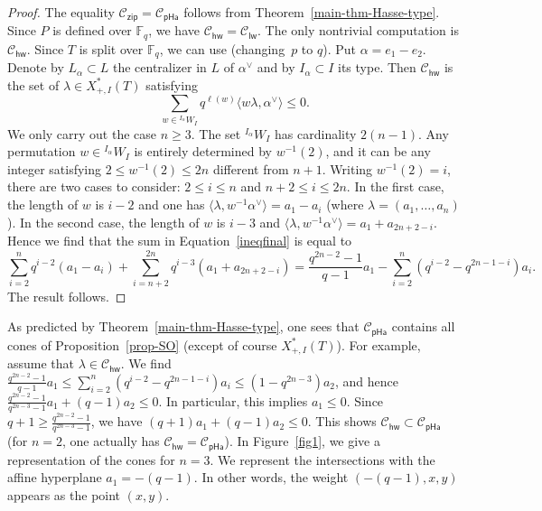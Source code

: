 \documentclass[11pt]{amsart}
\numberwithin{equation}{section}
\theoremstyle{definition}
\theoremstyle{remark}
\newcommand{\pha}{\mathsf{pHa}}
\newcommand{\zipsf}{\mathsf{zip}}
\newcommand{\lwsf}{\mathsf{lw}}
\newcommand{\hwsf}{\mathsf{hw}}
\newcommand{\Ccal}{{\mathcal C}}
\newcommand{\FF}{\mathbb{F}}
\begin{document}
\begin{proof}
The equality $\Ccal_{\zipsf} = \Ccal_{\pha}$ follows from Theorem~\ref{main-thm-Hasse-type}. Since $P$ is defined over $\FF_q$, we have $\Ccal_{\hwsf}=\Ccal_{\lwsf}$. The only nontrivial computation is $\Ccal_{\hwsf}$. Since $T$ is split over $\FF_q$, we can use \cite[Section~3.6]{Koskivirta-automforms-GZip} (changing~$p$ to $q$). Put $\alpha=e_1-e_2$. Denote by $L_\alpha \subset L$ the centralizer in $L$ of $\alpha^\vee$ and by $I_\alpha\subset I$ its type. Then $\Ccal_{\hwsf}$ is the set of $\lambda\in X_{+,I}^*(T)$ satisfying
\begin{equation}\label{ineqfinal}
\sum_{w\in {}^{I_\alpha} W_{I}} q^{\ell(w)}  \langle w \lambda, \alpha^\vee \rangle\leq 0.
\end{equation}
We only carry out the case $n\geq 3$. The set ${}^{I_{\alpha}}W_I$ has cardinality $2(n-1)$. Any permutation $w\in {}^{I_{\alpha}}W_I$ is entirely determined by $w^{-1}(2)$, and it can be any integer satisfying $2\leq w^{-1}(2)\leq 2n$ different from $n+1$. Writing $w^{-1}(2)=i$, there are two cases to consider: $2\leq i\leq n$ and $n+2\leq i\leq 2n$. In the first case, the length of $w$ is $i-2$ and one has  $\langle  \lambda, w^{-1}\alpha^\vee \rangle = a_1 - a_i$ (where $\lambda=(a_1,\dots ,a_n)$). In the second case, the length of $w$ is $i-3$ and  $\langle \lambda, w^{-1}\alpha^\vee \rangle = a_1 + a_{2n+2-i}$. Hence we find that the sum in Equation~\eqref{ineqfinal} is equal to
\begin{equation}
\sum_{i=2}^n q^{i-2} (a_1- a_i) + \sum_{i=n+2}^{2n} q^{i-3} (a_1+ a_{2n+2-i}) = \frac{q^{2n-2}-1}{q-1} a_1 - \sum_{i=2}^n (q^{i-2}-q^{2n-1-i})  a_i.
\end{equation}
The result follows.
\end{proof}

As predicted by Theorem~\ref{main-thm-Hasse-type}, one sees that $\Ccal_{\pha}$ contains all cones of Proposition~\ref{prop-SO} (except of course $X_{+,I}^*(T)$). For example, assume that $\lambda \in \Ccal_{\hwsf}$. We find $\frac{q^{2n-2}-1}{q-1}a_1 \leq \sum_{i=2}^n (q^{i-2}-q^{2n-1-i})  a_i  \leq  (1-q^{2n-3}) a_2$, and hence $\frac{q^{2n-2}-1}{q^{2n-3}-1}a_1+(q-1)a_2\leq 0$. In particular, this implies $a_1 \leq 0$. 
Since $q+1\geq \frac{q^{2n-2}-1}{q^{2n-3}-1}$, we have $(q+1)a_1+(q-1)a_2\leq 0$. This shows $\Ccal_{\hwsf}\subset \Ccal_{\pha}$ (for $n=2$, one actually has $\Ccal_{\hwsf}=\Ccal_{\pha}$). In Figure~\ref{fig1}, we give a representation of the cones for $n=3$. We represent the intersections with the affine hyperplane $a_1=-(q-1)$. In other words, the weight $(-(q-1),x,y)$ appears as the point $(x,y)$. 
\end{document}
